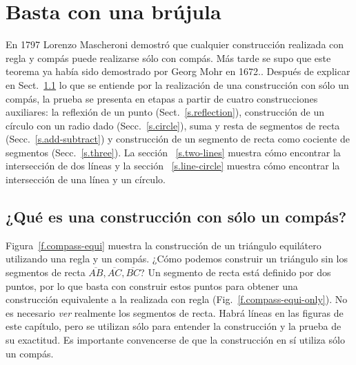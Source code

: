 
\chapter{Basta con una brújula}\label{c.compass}


En 1797 Lorenzo Mascheroni demostró que cualquier construcción realizada con regla y compás puede realizarse sólo con compás. Más tarde se supo que este teorema ya había sido demostrado por Georg Mohr en 1672..
Después de explicar en Sect.~\ref{s.compass-what} lo que se entiende por la realización de una construcción con sólo un compás, la prueba se presenta en etapas a partir de cuatro construcciones auxiliares: la reflexión de un punto (Sect.~\ref{s.reflection}), construcción de un círculo con un radio dado (Secc.~\ref{s.circle}), suma y resta de segmentos de recta (Secc.~\ref{s.add-subtract}) y construcción de un segmento de recta como cociente de segmentos (Secc.~\ref{s.three}). La sección ~\ref{s.two-lines} muestra cómo encontrar la intersección de dos líneas y la sección ~\ref{s.line-circle} muestra cómo encontrar la intersección de una línea y un círculo.

\section{¿Qué es una construcción con sólo un compás?}\label{s.compass-what}

Figura~\ref{f.compass-equi} muestra la construcción de un triángulo equilátero utilizando una regla y un compás. ¿Cómo podemos construir un triángulo sin los segmentos de recta $\overline{AB}, \overline{AC}, \overline{BC}$? Un segmento de recta está definido por dos puntos, por lo que basta con construir estos puntos para obtener una construcción equivalente a la realizada con regla (Fig.~\ref{f.compass-equi-only}). No es necesario \emph{ver} realmente los segmentos de recta.
Habrá líneas en las figuras de este capítulo, pero se utilizan sólo para entender la construcción y la prueba de su exactitud. Es importante convencerse de que la construcción en sí utiliza sólo un compás.


